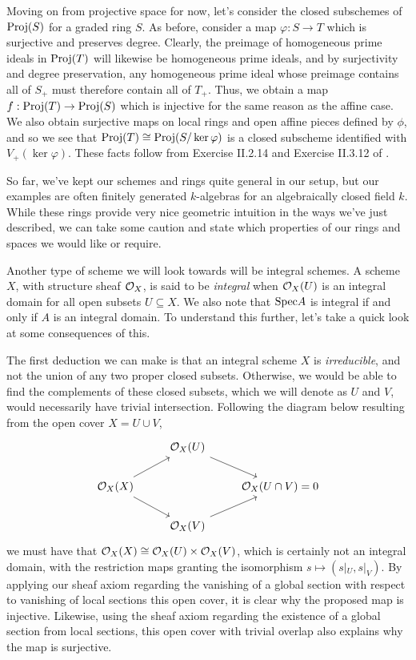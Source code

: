 Moving on from projective space for now,
let's consider the closed subschemes of ${\rm Proj}(S)$ for a graded ring $S$.
As before, consider a map $\varphi : S \to T$ which is surjective and preserves degree.
Clearly, the preimage of homogeneous prime ideals in ${\rm Proj}(T)$ will likewise be homogeneous prime ideals,
and by surjectivity and degree preservation, any homogeneous prime ideal whose preimage contains all of $S_+$ must therefore contain all of $T_+$.
Thus, we obtain a map $f: {\rm Proj}(T) \to {\rm Proj}(S)$ which is injective for the same reason as the affine case. 
We also obtain surjective maps on local rings and open affine pieces defined by $\phi$,
and so we see that ${\rm Proj}(T) \cong {\rm Proj}(S/\ker \varphi)$ is a closed subscheme identified with $V_+(\ker \varphi)$.
These facts follow from Exercise II.2.14  and Exercise II.3.12 of \cite{Hartshorne_2013}.

So far, we've kept our schemes and rings quite general in our setup,
but our examples are often finitely generated $k$-algebras for an algebraically closed field $k$.
While these rings provide very nice geometric intuition in the ways we've just described,
we can take some caution and state which properties of our rings and spaces we would like or require.

Another type of scheme we will look towards will be integral schemes.
A scheme $X$, with structure sheaf $\mathcal{O}_X$,
is said to be \textit{integral} when $\mathcal{O}_X(U)$ is an integral domain for all open subsets $U \subseteq X$.
We also note that ${\rm Spec} A$ is integral if and only if $A$ is an integral domain.
To understand this further,
let's take a quick look at some consequences of this.

The first deduction we can make is that an integral scheme $X$ is \textit{irreducible},
and not the union of any two proper closed subsets.
Otherwise, we would be able to find the complements of these closed subsets,
which we will denote as $U$ and $V$,
would necessarily have trivial intersection.
Following the diagram below resulting from the open cover $X = U \cup V$,
\[
    \begin{tikzcd}
        & \cO_X(U) \arrow[dr] \\
        \cO_X(X) \arrow[ur] \arrow[dr] & & \cO_X(U \cap V) = 0 \\
        & \cO_X(V) \arrow[ur]
    \end{tikzcd}
\]
we must have that $\mathcal{O}_X(X) \cong \mathcal{O}_X(U) \times \mathcal{O}_X(V)$, which is certainly not an integral domain,
with the restriction maps granting the isomorphism $ s \mapsto (s|_U, s|_V)$. 
By applying our sheaf axiom regarding the vanishing of a global section with respect to vanishing of local sections this open cover,
it is clear why the proposed map is injective.
Likewise, using the sheaf axiom regarding the existence of a global section from local sections, this open cover with trivial overlap also explains why the map is surjective.


